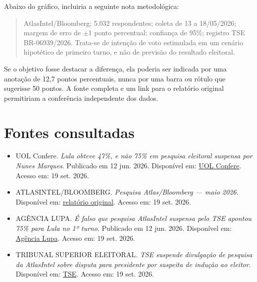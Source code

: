 \documentclass[12pt,a4paper]{article}
\begin{document}
Abaixo do gráfico, incluiria a seguinte nota metodológica:

\begin{quote}
\small
AtlasIntel/Bloomberg; 5.032 respondentes; coleta de 13 a 18/05/2026; margem de
erro de $\pm$1 ponto percentual; confiança de 95\%; registro TSE
BR-06939/2026. Trata-se de intenção de voto estimulada em um cenário hipotético
de primeiro turno, e não de previsão do resultado eleitoral.
\end{quote}

Se o objetivo fosse destacar a diferença, ela poderia ser indicada por uma
anotação de 12,7 pontos percentuais, nunca por uma barra ou rótulo que sugerisse
50 pontos. A fonte completa e um link para o relatório original permitiriam a
conferência independente dos dados.

\section{Fontes consultadas}

\begin{itemize}
  \item UOL Confere. \textit{Lula obteve 47\%, e não 75\% em pesquisa eleitoral suspensa por Nunes Marques}. Publicado em 12 jun. 2026. Disponível em: \href{https://noticias.uol.com.br/confere/ultimas-noticias/2026/06/12/lula-nao-teve-75-de-intencoes-de-voto-em-pesquisa-suspensa-pelo-tse.ghtm}{UOL Confere}. Acesso em: 19 set. 2026.
  \item ATLASINTEL/BLOOMBERG. \textit{Pesquisa Atlas/Bloomberg --- maio 2026}. Disponível em: \href{https://cdn.bncamazonas.com.br/wp-content/uploads/2026/05/AtlasIntel-19maio2026.pdf}{relatório original}. Acesso em: 19 set. 2026.
  \item AGÊNCIA LUPA. \textit{É falso que pesquisa AtlasIntel suspensa pelo TSE apontou 75\% para Lula no 1º turno}. Publicado em 12 jun. 2026. Disponível em: \href{https://www.agencialupa.org/verificacao/2026/06/12/e-falso-que-pesquisa-atlasintel-suspensa-pelo-tse-apontou-75-para-lula-no-1-turno/}{Agência Lupa}. Acesso em: 19 set. 2026.
  \item TRIBUNAL SUPERIOR ELEITORAL. \textit{TSE suspende divulgação de pesquisa da AtlasIntel sobre disputa para presidente por suspeita de indução ao eleitor}. Disponível em: \href{https://www.tse.jus.br/comunicacao/noticias/2026/Junho/tse-suspende-divulgacao-de-pesquisa-da-atlasintel-sobre-disputa-para-presidente-por-suspeita-de-inducao-ao-eleitor}{TSE}. Acesso em: 19 set. 2026.
\end{itemize}
\end{document}
